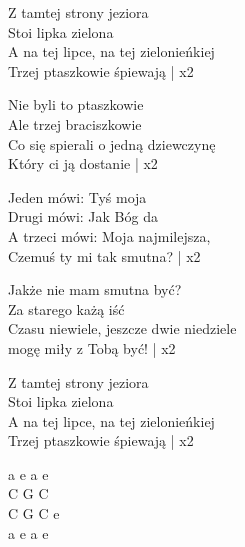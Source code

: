 \begin{text}
    Z tamtej strony jeziora\\
    Stoi lipka zielona\\
    \vin A na tej lipce, na tej zielonieńkiej\\
    \vin Trzej ptaszkowie śpiewają | x2

    Nie byli to ptaszkowie\\
    Ale trzej braciszkowie\\
    \vin Co się spierali o jedną dziewczynę\\
    \vin Który ci ją dostanie | x2

    Jeden mówi: Tyś moja\\
    Drugi mówi: Jak Bóg da\\
    \vin A trzeci mówi: Moja najmilejsza,\\
    \vin Czemuś ty mi tak smutna? | x2

    Jakże nie mam smutna być?\\
    Za starego każą iść\\
    \vin Czasu niewiele, jeszcze dwie niedziele\\
    \vin mogę miły z Tobą być! | x2

    Z tamtej strony jeziora\\
    Stoi lipka zielona\\
    \vin A na tej lipce, na tej zielonieńkiej\\
    \vin Trzej ptaszkowie śpiewają | x2
\end{text}
\begin{chord}
    a e a e\\
    C G C\\
    C G C e\\
    a e a e
\end{chord}